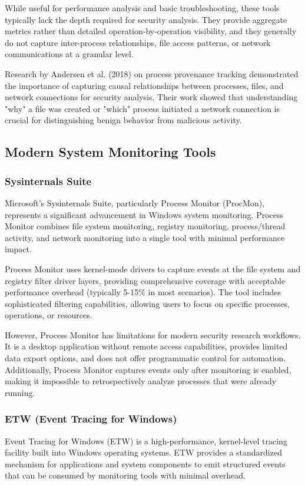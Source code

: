 While useful for performance analysis and basic troubleshooting, these tools typically lack the depth required for security analysis. They provide aggregate metrics rather than detailed operation-by-operation visibility, and they generally do not capture inter-process relationships, file access patterns, or network communications at a granular level.

Research by Andersen et al. (2018) on process provenance tracking demonstrated the importance of capturing causal relationships between processes, files, and network connections for security analysis. Their work showed that understanding "why" a file was created or "which" process initiated a network connection is crucial for distinguishing benign behavior from malicious activity.

\subsection{Modern System Monitoring Tools}

\subsubsection{Sysinternals Suite}
Microsoft's Sysinternals Suite, particularly Process Monitor (ProcMon), represents a significant advancement in Windows system monitoring. Process Monitor combines file system monitoring, registry monitoring, process/thread activity, and network monitoring into a single tool with minimal performance impact.

Process Monitor uses kernel-mode drivers to capture events at the file system and registry filter driver layers, providing comprehensive coverage with acceptable performance overhead (typically 5-15\% in most scenarios). The tool includes sophisticated filtering capabilities, allowing users to focus on specific processes, operations, or resources.

However, Process Monitor has limitations for modern security research workflows. It is a desktop application without remote access capabilities, provides limited data export options, and does not offer programmatic control for automation. Additionally, Process Monitor captures events only after monitoring is enabled, making it impossible to retrospectively analyze processes that were already running.

\subsubsection{ETW (Event Tracing for Windows)}
Event Tracing for Windows (ETW) is a high-performance, kernel-level tracing facility built into Windows operating systems. ETW provides a standardized mechanism for applications and system components to emit structured events that can be consumed by monitoring tools with minimal overhead.

